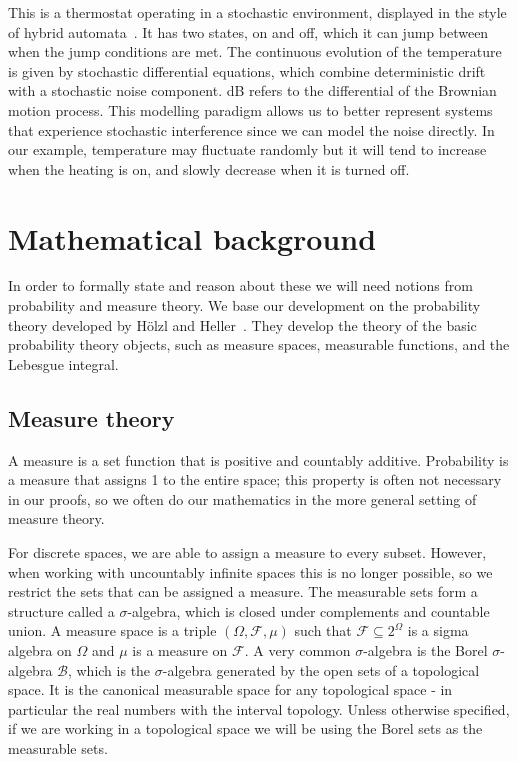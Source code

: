 \documentclass[orivec, envcountsame]{llncs}
\begin{document}
This is a thermostat operating in a stochastic environment, displayed in the style of hybrid automata~\cite{henzinger00}. It has two states, on and off, which it can jump between when the jump conditions are met. The continuous evolution of the temperature is given by stochastic differential equations, which combine deterministic drift with a stochastic noise component. dB refers to the differential of the Brownian motion process. This modelling paradigm allows us to better represent systems that experience stochastic interference since we can model the noise directly. In our example, temperature may fluctuate randomly but it will tend to increase when the heating is on, and slowly decrease when it is turned off.

\section{Mathematical background}\label{sec:background}
In order to formally state and reason about these we will need notions from probability and measure theory. We base our development on the probability theory developed by H{\"o}lzl and Heller~\cite{holzl11, holzlphd}. They develop the theory of the basic probability theory objects, such as measure spaces, measurable functions, and the Lebesgue integral.

\subsection{Measure theory}
A measure is a set function that is positive and countably additive. Probability is a measure that assigns 1 to the entire space; this property is often not necessary in our proofs, so we often do our mathematics in the more general setting of measure theory.

For discrete spaces, we are able to assign a measure to every subset. However, when working with uncountably infinite spaces this is no longer possible, so we restrict the sets that can be assigned a measure. The measurable sets form a structure called a \(\sigma\)-algebra, which is closed under complements and countable union. A measure space is a triple \((\Omega, \mathcal{F}, \mu)\) such that \(\mathcal{F} \subseteq 2^\Omega\) is a sigma algebra on \(\Omega\) and \(\mu\) is a measure on \(\mathcal{F}\). A very common \(\sigma\)-algebra is the Borel \(\sigma\)-algebra \(\mathcal{B}\), which is the \(\sigma\)-algebra generated by the open sets of a topological space. It is the canonical measurable space for any topological space - in particular the real numbers with the interval topology. Unless otherwise specified, if we are working in a topological space we will be using the Borel sets as the measurable sets.
\end{document}
